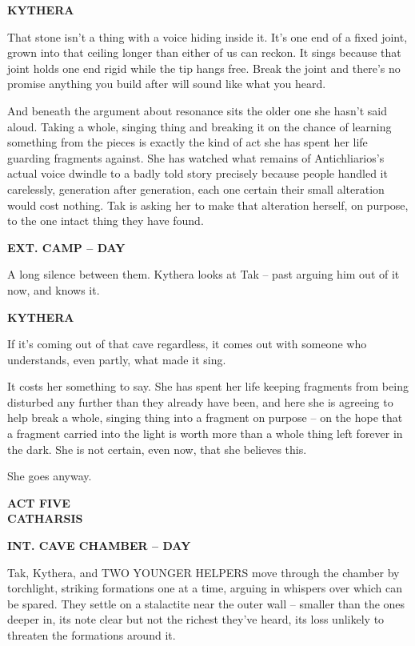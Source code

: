 \documentclass[12pt]{article}
\newcommand{\sceneheading}[1]{%
  \bigskip\noindent\textbf{#1}\par\smallskip
}
\newcommand{\action}[1]{%
  \noindent #1\par\medskip
}
\newcommand{\charcue}[1]{%
  \par\hspace*{2.2in}\textbf{#1}\par
}
\newenvironment{dialogue}{%
  \begin{list}{}{\leftmargin=1.5in\rightmargin=2in\itemsep=0pt\parsep=0pt\topsep=0pt}
  \item[]
}{%
  \end{list}\medskip
}
\newcommand{\actbreak}[1]{%
  \clearpage\thispagestyle{empty}\vspace*{3in}
  \begin{center}{\Large\textbf{#1}}\end{center}
  \clearpage
}
\begin{document}
\charcue{KYTHERA}
\begin{dialogue}
That stone isn't a thing with a voice hiding inside it. It's one end of a fixed joint, grown into that ceiling longer than either of us can reckon. It sings because that joint holds one end rigid while the tip hangs free. Break the joint and there's no promise anything you build after will sound like what you heard.
\end{dialogue}

\action{And beneath the argument about resonance sits the older one she hasn't said aloud. Taking a whole, singing thing and breaking it on the chance of learning something from the pieces is exactly the kind of act she has spent her life guarding fragments against. She has watched what remains of Antichliarios's actual voice dwindle to a badly told story precisely because people handled it carelessly, generation after generation, each one certain their small alteration would cost nothing. Tak is asking her to make that alteration herself, on purpose, to the one intact thing they have found.}

\sceneheading{EXT. CAMP -- DAY}

\action{A long silence between them. Kythera looks at Tak -- past arguing him out of it now, and knows it.}

\charcue{KYTHERA}
\begin{dialogue}
If it's coming out of that cave regardless, it comes out with someone who understands, even partly, what made it sing.
\end{dialogue}

\action{It costs her something to say. She has spent her life keeping fragments from being disturbed any further than they already have been, and here she is agreeing to help break a whole, singing thing into a fragment on purpose -- on the hope that a fragment carried into the light is worth more than a whole thing left forever in the dark. She is not certain, even now, that she believes this.}

\action{She goes anyway.}

\actbreak{ACT FIVE\\ \large CATHARSIS}

\sceneheading{INT. CAVE CHAMBER -- DAY}

\action{Tak, Kythera, and TWO YOUNGER HELPERS move through the chamber by torchlight, striking formations one at a time, arguing in whispers over which can be spared. They settle on a stalactite near the outer wall -- smaller than the ones deeper in, its note clear but not the richest they've heard, its loss unlikely to threaten the formations around it.}
\end{document}

